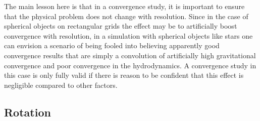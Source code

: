 \documentclass[iop,numberedappendix]{../emulateapj}
\begin{document}
The main lesson here is that in a convergence study, it is important
to ensure that the physical problem does not change with
resolution. Since in the case of spherical objects on rectangular
grids the effect may be to artificially boost convergence with resolution,
in a simulation with spherical objects like stars one can envision a
scenario of being fooled into believing apparently good convergence
results that are simply a convolution of artificially high
gravitational convergence and poor convergence in the hydrodynamics. A
convergence study in this case is only fully valid if there is reason
to be confident that this effect is negligible compared to other
factors.

\subsection{Rotation}\label{sec:rotation}
\end{document}
